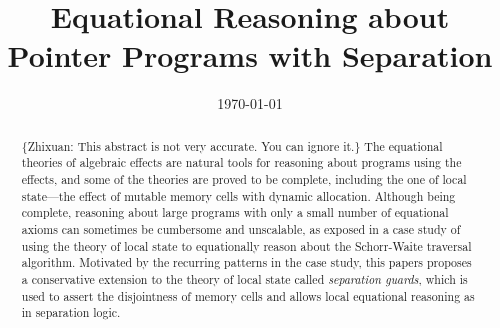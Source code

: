 \documentclass[runningheads]{llncs}
\newcommand{\Zhixuan}[2][blue]{{\color{#1}\{Zhixuan: #2\}}}
\begin{document}
%
\title{Equational Reasoning about Pointer Programs with Separation}
%
%
\author{\today}
%


%
%
\maketitle              %
%
\begin{abstract}
  \Zhixuan[red]{This abstract is not very accurate. You can ignore it.}
  The equational theories of algebraic effects are natural tools for reasoning about programs using the effects, and some of the theories are proved to be complete, including the one of local state---the effect of mutable memory cells with dynamic allocation.
  Although being complete, reasoning about large programs with only a small number of equational axioms can sometimes be cumbersome and unscalable, as exposed in a case study of using the theory of local state to equationally reason about the Schorr-Waite traversal algorithm.
  Motivated by the recurring patterns in the case study, this papers proposes a conservative extension to the theory of local state called \emph{separation guards}, which is used to assert the disjointness of memory cells and allows local equational reasoning as in separation logic.

\end{abstract}
%
%
%
\end{document}
